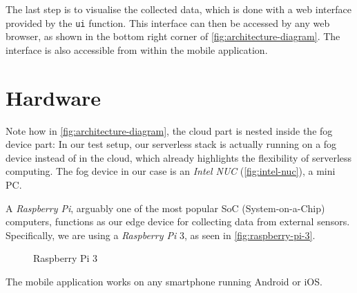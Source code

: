 The last step is to visualise the collected data, which is done with a web interface provided by the
\texttt{ui} function. This interface can then be accessed by any web browser, as shown in the bottom
right corner of \autoref{fig:architecture-diagram}. The interface is also accessible from within
the mobile application.

\section{Hardware}

Note how in \autoref{fig:architecture-diagram}, the cloud part is nested inside the fog device part:
In our test setup, our serverless stack is actually running on a fog device instead of in the cloud,
which already highlights the flexibility of serverless computing. The fog device in our case is an
\textit{Intel NUC} (\autoref{fig:intel-nuc}), a mini PC.

\begin{figure}[H]
  \centering
  \caption{}
  \label{fig:intel-nuc}
\end{figure}

A \textit{Raspberry Pi}, arguably one of the most popular SoC (System-on-a-Chip) computers,
functions as our edge device for collecting data from external sensors. Specifically, we are using a
\textit{Raspberry Pi} 3, as seen in \autoref{fig:raspberry-pi-3}.

\begin{figure}[H]
  \centering
  \caption{Raspberry Pi 3}
  \label{fig:raspberry-pi-3}
\end{figure}

The mobile application works on any smartphone running Android or iOS.
